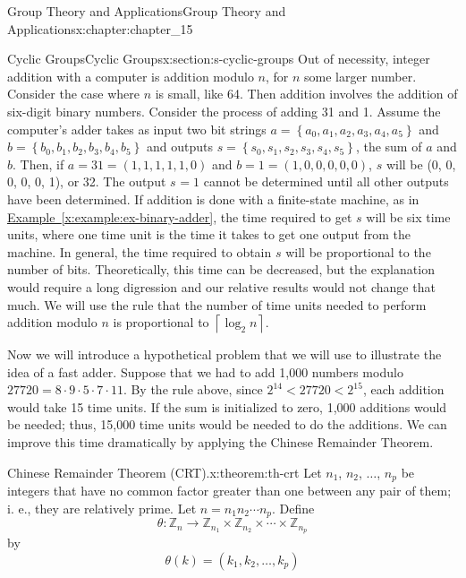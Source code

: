 \documentclass[oneside,10pt,]{book}
\newcommand{\xreffont}{\relax}
\numberwithin{equation}{section}
\begin{document}
\begin{chapterptx}{Group Theory and Applications}{}{Group Theory and Applications}{}{}{x:chapter:chapter_15}
\begin{sectionptx}{Cyclic Groups}{}{Cyclic Groups}{}{}{x:section:s-cyclic-groups}
Out of necessity, integer addition with a computer is addition modulo \(n\), for \(n\) some larger number. Consider the case where \(n\) is small, like 64. Then addition involves the addition of six-digit binary numbers. Consider the process of adding 31 and 1. Assume the computer's adder takes as input two bit strings  \(a = \left\{a_0,a_1,a_2,a_3,a_4,a_5\right\}\) and \(b=\left\{b_0,b_1,b_2,b_3,b_4,b_5\right\}\) and outputs \(s = \left\{s_0,s_1,s_2,s_3,s_4,s_5\right\}\), the sum of \(a\) and \(b\). Then, if \(a = 31 = (1, 1, 1, 1, 1, 0)\) and \(b = 1 = (1, 0, 0, 0, 0, 0)\), \(s\) will be (0, 0, 0, 0, 0, 1), or 32. The output \(s_{ }=1\) cannot be determined until all other outputs have been determined. If addition is done with a finite-state machine, as in \hyperref[x:example:ex-binary-adder]{Example~{\xreffont\ref{x:example:ex-binary-adder}}}, the time required to get \(s\) will be six time units, where one time unit is the time it takes to get one output from the machine.  In general, the time required to obtain \(s\) will be proportional to the number of bits.   Theoretically, this time can be decreased, but the explanation would require a long digression and our relative results would not change that much. We will use the rule that the number of time units needed to perform addition modulo \(n\) is proportional to  \(\left\lceil \log_2n\right\rceil\).%
\par
Now we will introduce a hypothetical problem that we will use to illustrate the idea of a fast adder. Suppose that we had to add 1,000 numbers modulo \(27720 = 8 \cdot  9 \cdot  5 \cdot 7\cdot 11\). By the rule above, since \(2^{14} < 27720 < 2^{15}\), each addition would take 15 time units. If the sum is initialized to zero, 1,000 additions would be needed; thus, 15,000 time units would be needed to do the additions. We can improve this time dramatically by applying the Chinese Remainder Theorem.%
\begin{theorem}{Chinese Remainder Theorem (CRT).}{}{x:theorem:th-crt}%
%
%
Let \(n_1\), \(n_2\), \(\ldots\), \(n_p\) be integers that have no common factor greater than one between any pair of them; i. e., they are relatively prime.  Let \(n = n_1n_2\cdots  n_p\). Define%
\begin{equation*}
\theta:\mathbb{Z}_n\to  \mathbb{Z}_{n_1}\times \mathbb{Z}_{n_2}\times  \cdots \times \mathbb{Z}_{n_p}
\end{equation*}
by%
\begin{equation*}
\theta(k) = \left(k_1, k_2, \ldots , k_p\right)

\end{equation*}
\end{theorem}
\end{sectionptx}
\end{chapterptx}
\end{document}
